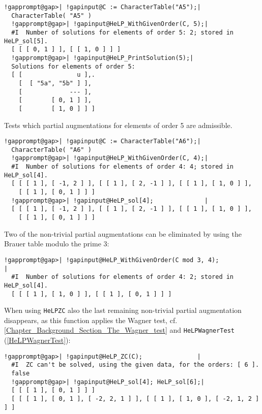\documentclass[a4paper,11pt]{report}
\begin{document}
{{ 
\begin{Verbatim}[commandchars=!@|,fontsize=\small,frame=single,label=Example]
  !gapprompt@gap>| !gapinput@C := CharacterTable("A5");|
  CharacterTable( "A5" )
  !gapprompt@gap>| !gapinput@HeLP_WithGivenOrder(C, 5);|
  #I  Number of solutions for elements of order 5: 2; stored in HeLP_sol[5].
  [ [ [ 0, 1 ] ], [ [ 1, 0 ] ] ]
  !gapprompt@gap>| !gapinput@HeLP_PrintSolution(5);|
  Solutions for elements of order 5:
  [ [               u ],.
    [  [ "5a", "5b" ] ],
    [             --- ],
    [        [ 0, 1 ] ],
    [        [ 1, 0 ] ] ]
\end{Verbatim}
 Tests which partial augmentations for elements of order 5 are admissible. 
\begin{Verbatim}[commandchars=!@|,fontsize=\small,frame=single,label=Example]
  !gapprompt@gap>| !gapinput@C := CharacterTable("A6");|
  CharacterTable( "A6" )
  !gapprompt@gap>| !gapinput@HeLP_WithGivenOrder(C, 4);|
  #I  Number of solutions for elements of order 4: 4; stored in HeLP_sol[4].
  [ [ [ 1 ], [ -1, 2 ] ], [ [ 1 ], [ 2, -1 ] ], [ [ 1 ], [ 1, 0 ] ], 
    [ [ 1 ], [ 0, 1 ] ] ]
  !gapprompt@gap>| !gapinput@HeLP_sol[4];              |
  [ [ [ 1 ], [ -1, 2 ] ], [ [ 1 ], [ 2, -1 ] ], [ [ 1 ], [ 1, 0 ] ], 
    [ [ 1 ], [ 0, 1 ] ] ]
\end{Verbatim}
 Two of the non-trivial partial augmentations can be eliminated by using the
Brauer table modulo the prime $3$: 
\begin{Verbatim}[commandchars=!@|,fontsize=\small,frame=single,label=Example]
  !gapprompt@gap>| !gapinput@HeLP_WithGivenOrder(C mod 3, 4);                                                                    |
  #I  Number of solutions for elements of order 4: 2; stored in HeLP_sol[4].
  [ [ [ 1 ], [ 1, 0 ] ], [ [ 1 ], [ 0, 1 ] ] ]
\end{Verbatim}
 When using \texttt{HeLP{\textunderscore}ZC} also the last remaining non-trivial partial augmentation disappears, as this
function applies the Wagner test, cf. \ref{Chapter_Background_Section_The_Wagner_test} and \texttt{HeLP{\textunderscore}WagnerTest} (\ref{HeLPWagnerTest}): 
\begin{Verbatim}[commandchars=!@|,fontsize=\small,frame=single,label=Example]
  !gapprompt@gap>| !gapinput@HeLP_ZC(C);               |
  #I  ZC can't be solved, using the given data, for the orders: [ 6 ].
  false
  !gapprompt@gap>| !gapinput@HeLP_sol[4]; HeLP_sol[6];|
  [ [ [ 1 ], [ 0, 1 ] ] ]
  [ [ [ 1 ], [ 0, 1 ], [ -2, 2, 1 ] ], [ [ 1 ], [ 1, 0 ], [ -2, 1, 2 ] ] ]
\end{Verbatim}
}}
\end{document}
